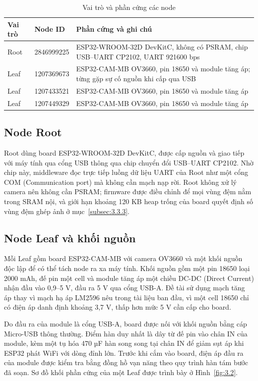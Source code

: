 \begin{table}[!htbp]
\centering
\caption{Vai trò và phần cứng các node}\label{tab:3.1}
{\fontsize{12}{14.5}\selectfont\renewcommand{\arraystretch}{1.25}
\begin{tabular}{|C{1.70cm}|L{2.94cm}|L{9.00cm}|}
\hline
\textbf{Vai trò} & \textbf{Node ID} & \textbf{Phần cứng và ghi chú} \\
\hline
Root & 2846999225 & ESP32-WROOM-32D DevKitC, không có PSRAM, chip USB–UART CP2102, UART 921600 bps \\
\hline
Leaf & 1207369673 & ESP32-CAM-MB OV3660, pin 18650 và module tăng áp; từng gặp sự cố nguồn khi cấp qua USB \\
\hline
Leaf & 1207433521 & ESP32-CAM-MB OV3660, pin 18650 và module tăng áp \\
\hline
Leaf & 1207449329 & ESP32-CAM-MB OV3660, pin 18650 và module tăng áp \\
\hline
\end{tabular}}
\end{table}


\subsection{Node Root}

Root dùng board ESP32-WROOM-32D DevKitC, được cấp nguồn và giao tiếp với máy tính qua cổng USB thông qua chip chuyển đổi USB–UART CP2102. Nhờ chip này, middleware đọc trực tiếp luồng dữ liệu UART của Root như một cổng COM (Communication port) mà không cần mạch nạp rời. Root không xử lý camera nên không cần PSRAM; firmware được điều chỉnh để mọi vùng đệm nằm trong SRAM nội, và giới hạn khoảng 120 KB heap trống của board quyết định số vùng đệm ghép ảnh ở mục~\ref{subsec:3.3.3}.


\subsection{Node Leaf và khối nguồn}

Mỗi Leaf gồm board ESP32-CAM-MB với camera OV3660 và một khối nguồn độc lập để có thể tách node ra xa máy tính. Khối nguồn gồm một pin 18650 loại 2000 mAh, đế pin một cell và module tăng áp một chiều DC-DC (Direct Current) nhận đầu vào 0,9–5 V, đầu ra 5 V qua cổng USB-A. Đề tài sử dụng mạch tăng áp thay vì mạch hạ áp LM2596 nêu trong tài liệu ban đầu, vì một cell 18650 chỉ có điện áp danh định khoảng 3,7 V, thấp hơn mức 5 V cần cấp cho board.

Do đầu ra của module là cổng USB-A, board được nối với khối nguồn bằng cáp Micro-USB thông thường. Điểm hàn duy nhất là dây từ đế pin vào chân IN của module, kèm một tụ hóa 470 µF hàn song song tại chân IN để giảm sụt áp khi ESP32 phát WiFi với dòng đỉnh lớn. Trước khi cắm vào board, điện áp đầu ra của module được kiểm tra bằng đồng hồ vạn năng theo quy trình hàn tám bước đã soạn. Sơ đồ khối phần cứng của một Leaf được trình bày ở Hình~\ref{fig:3.2}.


